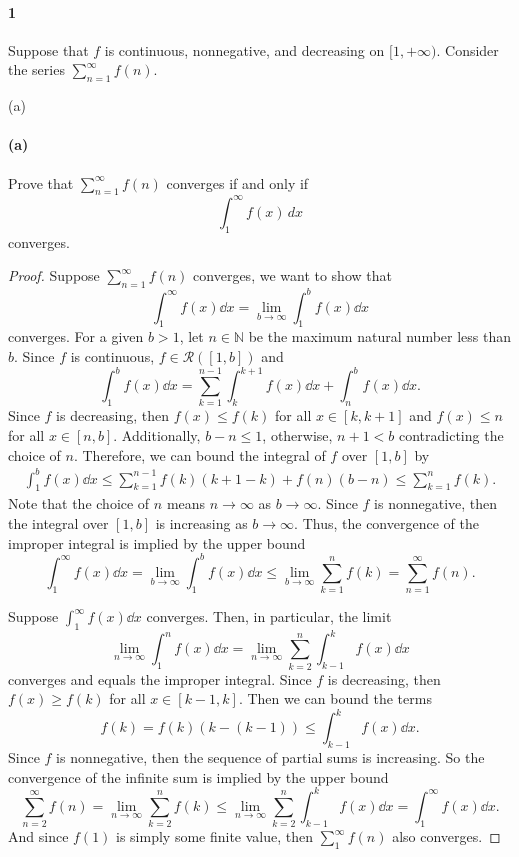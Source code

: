 \documentclass[12pt]{article}
\newenvironment{fullbox}{\begin{lrbox}{\savefullbox}\begin{minipage}{\dimexpr\textwidth-2\fboxsep\relax}}{\end{minipage}\end{lrbox}\begin{center}\framebox[\textwidth]{\usebox{\savefullbox}}\end{center}}
\newenvironment{pbox}[1][]{\begin{fullbox}\ifx#1\empty\else\paragraph{#1}\fi}{\end{fullbox}}
\theoremstyle{definition}
\newcommand{\N}{\mathbb{N}}
\newcommand{\RR}{\mathcal{R}}
\begin{document}
\thispagestyle{title}


\begin{pbox}[1]
    Suppose that $f$ is continuous, nonnegative, and decreasing on $[1,+\infty)$. Consider the series $\sum_{n=1}^\infty f(n)$. 
\end{pbox}

\begin{pbox}[(a)]
    Prove that $\sum_{n=1}^\infty f(n)$ converges if and only if 
    \begin{equation}
    \int_1^\infty f(x)\,dx
    \end{equation}
    converges.
\end{pbox}

\begin{proof}
    Suppose $\sum_{n=1}^{\infty} f(n)$ converges, we want to show that
    \[
        \int_1^\infty f(x) \dd{x} = \lim_{b \to \infty} \int_1^b f(x) \dd{x}
    \]
    converges. For a given $b > 1$, let $n \in \N$ be the maximum natural number less than $b$. Since $f$ is continuous, $f \in \RR([1, b])$ and
    \[
        \int_1^b f(x) \dd{x} = \sum_{k=1}^{n-1}\int_{k}^{k+1} f(x) \dd{x} + \int_{n}^{b} f(x) \dd{x}.
    \]
    Since $f$ is decreasing, then $f(x) \leq f(k)$ for all $x \in [k, k+1]$ and $f(x) \leq n$ for all $x \in [n, b]$. Additionally, $b - n \leq 1$, otherwise, $n + 1 < b$ contradicting the choice of $n$. Therefore, we can bound the integral of $f$ over $[1, b]$ by
    \begin{align*}
        \int_1^b f(x) \dd{x}
            \leq \sum_{k=1}^{n-1} f(k)(k+1-k) + f(n)(b-n)
            \leq \sum_{k=1}^{n}f(k).
    \end{align*}
    Note that the choice of $n$ means $n \to \infty$ as $b \to \infty$. Since $f$ is nonnegative, then the integral over $[1,b]$ is increasing as $b \to \infty$. Thus, the convergence of the improper integral is implied by the upper bound
    \[
        \int_1^\infty f(x) \dd{x}
            = \lim_{b \to \infty} \int_1^b f(x) \dd{x}
            \leq \lim_{b \to \infty} \sum_{k=1}^{n}f(k)
            = \sum_{n=1}^{\infty}f(n).
    \]
    
    Suppose $\int_{1}^{\infty} f(x) \dd{x}$ converges. Then, in particular, the limit
    \[
        \lim_{n \to \infty} \int_{1}^{n} f(x) \dd{x}
            = \lim_{n \to \infty} \sum_{k=2}^{n} \int_{k-1}^{k} f(x) \dd{x}
    \]
    converges and equals the improper integral. Since $f$ is decreasing, then $f(x) \geq f(k)$ for all $x \in [k-1, k]$. Then we can bound the terms
    \[
        f(k)
            = f(k)(k - (k-1))
            \leq \int_{k-1}^{k} f(x) \dd{x} .
    \]
    Since $f$ is nonnegative, then the sequence of partial sums is increasing. So the convergence of the infinite sum is implied by the upper bound
    \[
        \sum_{n=2}^{\infty} f(n)
            = \lim_{n \to \infty} \sum_{k=2}^{n} f(k)
            \leq \lim_{n \to \infty} \sum_{k=2}^{n} \int_{k-1}^{k} f(x) \dd{x}
            = \int_1^\infty f(x) \dd{x}.
    \]
    And since $f(1)$ is simply some finite value, then $\sum_{1}^{\infty} f(n)$ also converges.
    
\end{proof}
\end{document}
